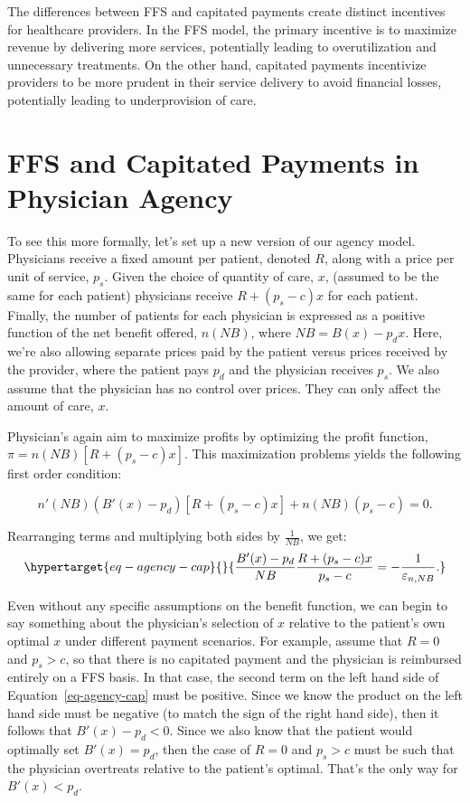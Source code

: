 \documentclass[
  letterpaper,
  DIV=11,
  numbers=noendperiod]{scrreport}
\theoremstyle{definition}
\theoremstyle{remark}
\begin{document}
The differences between FFS and capitated payments create distinct
incentives for healthcare providers. In the FFS model, the primary
incentive is to maximize revenue by delivering more services,
potentially leading to overutilization and unnecessary treatments. On
the other hand, capitated payments incentivize providers to be more
prudent in their service delivery to avoid financial losses, potentially
leading to underprovision of care.

\hypertarget{ffs-and-capitated-payments-in-physician-agency}{%
\section{FFS and Capitated Payments in Physician
Agency}\label{ffs-and-capitated-payments-in-physician-agency}}

To see this more formally, let's set up a new version of our agency
model. Physicians receive a fixed amount per patient, denoted \(R\),
along with a price per unit of service, \(p_{s}\). Given the choice of
quantity of care, \(x\), (assumed to be the same for each patient)
physicians receive \(R + (p_{s} - c)x\) for each patient. Finally, the
number of patients for each physician is expressed as a positive
function of the net benefit offered, \(n(NB)\), where
\(NB=B(x) - p_{d}x\). Here, we're also allowing separate prices paid by
the patient versus prices received by the provider, where the patient
pays \(p_{d}\) and the physician receives \(p_{s}\). We also assume that
the physician has no control over prices. They can only affect the
amount of care, \(x\).

Physician's again aim to maximize profits by optimizing the profit
function, \(\pi=n(NB)\left[R+(p_{s}-c)x\right]\). This maximization
problems yields the following first order condition:

\[n'(NB)(B'(x) - p_{d}) \left[R + (p_{s} - c)x \right] + n(NB)(p_{s}-c) = 0.\]

Rearranging terms and multiplying both sides by \(\frac{1}{NB}\), we
get:
\begin{equation}\protect\hypertarget{eq-agency-cap}{}{\frac{B'(x) - p_{d}}{NB} \frac{R + (p_{s} - c)x}{p_{s}-c} = - \frac{1}{\varepsilon_{n,NB}}.}\label{eq-agency-cap}\end{equation}

Even without any specific assumptions on the benefit function, we can
begin to say something about the physician's selection of \(x\) relative
to the patient's own optimal \(x\) under different payment scenarios.
For example, assume that \(R=0\) and \(p_{s}>c\), so that there is no
capitated payment and the physician is reimbursed entirely on a FFS
basis. In that case, the second term on the left hand side of
Equation~\ref{eq-agency-cap} must be positive. Since we know the product
on the left hand side must be negative (to match the sign of the right
hand side), then it follows that \(B'(x) - p_{d}<0\). Since we also know
that the patient would optimally set \(B'(x)=p_{d}\), then the case of
\(R=0\) and \(p_{s}>c\) must be such that the physician overtreats
relative to the patient's optimal. That's the only way for
\(B'(x)<p_{d}\).
\end{document}
